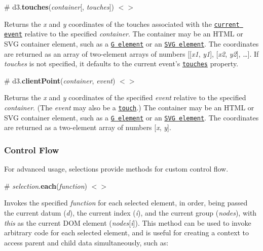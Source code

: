 \label{_touches}%
\# d3.{\bfseries touches}({\itshape container}\mbox{[}, {\itshape touches}\mbox{]}) \href{https://github.com/d3/d3-selection/blob/master/src/touches.js}{\tt $<$$>$}

Returns the {\itshape x} and {\itshape y} coordinates of the touches associated with the \href{#event}{\tt current event} relative to the specified {\itshape container}. The container may be an H\+T\+ML or S\+VG container element, such as a \href{http://www.w3.org/TR/SVG/struct.html#Groups}{\tt G element} or an \href{http://www.w3.org/TR/SVG/struct.html#SVGElement}{\tt S\+VG element}. The coordinates are returned as an array of two-\/element arrays of numbers \mbox{[}\mbox{[}{\itshape x1}, {\itshape y1}\mbox{]}, \mbox{[}{\itshape x2}, {\itshape y2}\mbox{]}, …\mbox{]}. If {\itshape touches} is not specified, it defaults to the current event’s \href{http://developer.apple.com/library/safari/documentation/UserExperience/Reference/TouchEventClassReference/TouchEvent/TouchEvent.html#//apple_ref/javascript/instp/TouchEvent/touches}{\tt touches} property.

\label{_clientPoint}%
\# d3.{\bfseries client\+Point}({\itshape container}, {\itshape event}) \href{https://github.com/d3/d3-selection/blob/master/src/point.js}{\tt $<$$>$}

Returns the {\itshape x} and {\itshape y} coordinates of the specified {\itshape event} relative to the specified {\itshape container}. (The {\itshape event} may also be a \href{https://www.w3.org/TR/touch-events/#touch-interface}{\tt touch}.) The container may be an H\+T\+ML or S\+VG container element, such as a \href{http://www.w3.org/TR/SVG/struct.html#Groups}{\tt G element} or an \href{http://www.w3.org/TR/SVG/struct.html#SVGElement}{\tt S\+VG element}. The coordinates are returned as a two-\/element array of numbers \mbox{[}{\itshape x}, {\itshape y}\mbox{]}.

\subsubsection*{Control Flow}

For advanced usage, selections provide methods for custom control flow.

\label{_selection_each}%
\# {\itshape selection}.{\bfseries each}({\itshape function}) \href{https://github.com/d3/d3-selection/blob/master/src/selection/each.js}{\tt $<$$>$}

Invokes the specified {\itshape function} for each selected element, in order, being passed the current datum ({\itshape d}), the current index ({\itshape i}), and the current group ({\itshape nodes}), with {\itshape this} as the current D\+OM element ({\itshape nodes}\mbox{[}{\itshape i}\mbox{]}). This method can be used to invoke arbitrary code for each selected element, and is useful for creating a context to access parent and child data simultaneously, such as\+:


